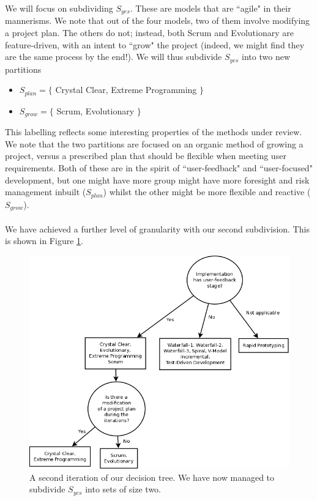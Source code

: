 We will focus on subdividing $S_{yes}$.
These are models that are ``agile" in their mannerisms.
We note that out of the four models, two of them involve modifying a project
plan.
The others do not; instead, both Scrum and Evolutionary are feature-driven, with
an intent to ``grow" the project (indeed, we might find they are the same
process by the end!).
We will thus subdivide $S_{yes}$ into two new partitions
\begin{itemize}
  \item $S_{plan} = \{$ Crystal Clear, Extreme Programming $\}$
  \item $S_{grow} = \{$ Scrum, Evolutionary $\}$
\end{itemize}
This labelling reflects some interesting properties of the methods under review.
We note that the two partitions are focused on an organic method of
growing a project, versus a prescribed plan that should be flexible when meeting
user requirements.
Both of these are in the spirit of ``user-feedback" and ``user-focused"
development, but one might have more group might have more foresight and risk
management inbuilt ($S_{plan}$) whilst the other might be more flexible and
reactive ($S_{grow}$).\\
\\
We have achieved a further level of granularity with our second subdivision.
This is shown in Figure \ref{DecTree2}.
\begin{figure}[ht!]
  \includegraphics[scale=0.4]{media/DecisionTree2}
  \caption{A second iteration of our decision tree. We have now managed to
  subdivide $S_{yes}$ into sets of size two.}
  \label{DecTree2}
\end{figure}

